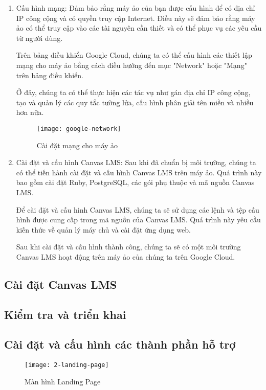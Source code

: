 \documentclass[../Thesis.tex]{subfiles}
\begin{document}
\begin{enumerate}
        \item Cấu hình mạng: Đảm bảo rằng máy ảo của bạn được cấu hình để có địa chỉ IP công cộng và có quyền truy cập Internet. Điều này sẽ đảm bảo rằng máy ảo có thể truy cập vào các tài nguyên cần thiết và có thể phục vụ các yêu cầu từ người dùng.

        Trên bảng điều khiển Google Cloud, chúng ta có thể cấu hình các thiết lập mạng cho máy ảo bằng cách điều hướng đến mục "Network" hoặc "Mạng" trên bảng điều khiển.
        
        Ở đây, chúng ta có thể thực hiện các tác vụ như gán địa chỉ IP công cộng, tạo và quản lý các quy tắc tường lửa, cấu hình phân giải tên miền và nhiều hơn nữa.

        \begin{figure}[ht!]
            \centering\texttt{[image: google-network]}
            \caption{Cài đặt mạng cho máy ảo}
            \label{fig:google-network}
        \end{figure}

        \item Cài đặt và cấu hình Canvas LMS: Sau khi đã chuẩn bị môi trường, chúng ta có thể tiến hành cài đặt và cấu hình Canvas LMS trên máy ảo. Quá trình này bao gồm cài đặt Ruby, PostgreSQL, các gói phụ thuộc và mã nguồn Canvas LMS.

        Để cài đặt và cấu hình Canvas LMS, chúng ta sẽ sử dụng các lệnh và tệp cấu hình được cung cấp trong mã nguồn của Canvas LMS. Quá trình này yêu cầu kiến thức về quản lý máy chủ và cài đặt ứng dụng web.
        
        Sau khi cài đặt và cấu hình thành công, chúng ta sẽ có một môi trường Canvas LMS hoạt động trên máy ảo của chúng ta trên Google Cloud.
    \end{enumerate}
    \subsection{Cài đặt Canvas LMS}
    \subsection{Kiểm tra và triển khai}
    \subsection{Cài đặt và cấu hình các thành phần hỗ trợ}

    \begin{figure}[ht!]
        \centering\texttt{[image: 2-landing-page]}
        \caption{Màn hình Landing Page}
        \label{fig:landing-page}
    \end{figure}
\end{document}
